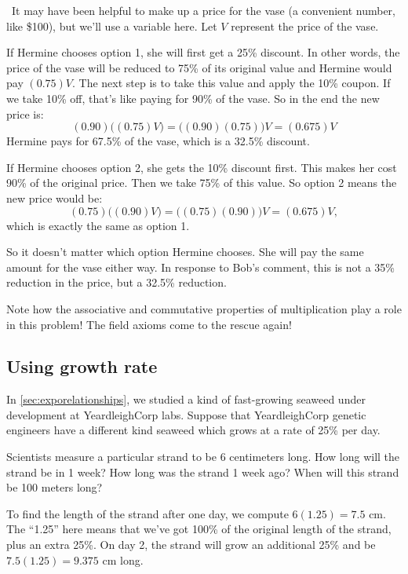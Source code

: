 \begin{boxex}
\exsoln\ It may have been helpful to make up a price for the vase (a convenient number, like \$100), but we'll use a variable here. Let $V$ represent the price of the vase.

If Hermine chooses option 1, she will first get a 25\% discount. In other words, the price of the vase will be reduced to 75\% of its original value and Hermine would pay $(0.75)V$. The next step is to take this value and apply the 10\% coupon. If we take 10\% off, that's like paying for 90\% of the vase. So in the end the new price is: \[(0.90)\bigl((0.75)V\bigr) = \bigl((0.90)(0.75)\bigr)V= (0.675)V\] Hermine pays for 67.5\% of the vase, which is a 32.5\% discount.

If Hermine chooses option 2, she gets the 10\% discount first. This makes her cost 90\% of the original price. Then we take 75\% of this value. So option 2 means the new price would be: \[(0.75)\bigl((0.90)V\bigr) = \bigl((0.75)(0.90)\bigr)V = (0.675)V,\] which is exactly the same as option 1.

So it doesn't matter which option Hermine chooses. She will pay the same amount for the vase either way. In response to Bob's comment, this is not a 35\% reduction in the price, but a 32.5\% reduction.
\end{boxex}

Note how the associative and commutative properties of multiplication play a role in this problem! The field axioms come to the rescue again!

\subsection{Using growth rate}

In \cref{sec:exporelationships}, we studied a kind of fast-growing seaweed under development at YeardleighCorp labs. Suppose that YeardleighCorp genetic engineers have a different kind seaweed which grows at a rate of 25\% per day.

Scientists measure a particular strand to be 6 centimeters long. How long will the strand be in 1 week? How long was the strand 1 week ago? When will this strand be 100 meters long?

To find the length of the strand after one day, we compute $6(1.25) = 7.5$ cm. The ``1.25'' here means that we've got 100\% of the original length of the strand, plus an extra 25\%. On day 2, the strand will grow an additional 25\% and be $7.5(1.25) = 9.375$ cm long.

